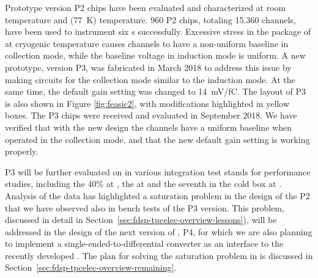 Prototype version P2  chips have been evaluated and 
characterized at room temperature and \lntwo (\SI{77}{K}) temperature. 
\num{960} P2 chips, totaling \num{15,360} channels, 
have been used to instrument six  s successfully. 
Excessive stress in the package of  at cryogenic 
temperature causes  channels to have a non-uniform baseline in 
collection mode, while the baseline  voltage in induction mode 
is uniform. A new prototype, version P3, was fabricated in March 2018 
to address this issue by making  circuits for the collection mode 
similar to the induction mode. At the same time, the default gain
setting was changed to \SI{14}{mV/fC}. The layout of P3
 is also shown in Figure \ref{fig:feasic2}, with modifications 
highlighted in yellow boxes. The P3  chips were 
received and evaluated in September 2018. We have verified that with
the new design the  channels have a uniform baseline when
operated in the collection mode, and that the new default gain setting
is working properly.

P3  will be further evaluated on  
in various integration test stands for performance studies, including 
the \num{40}\%  at , the   
at  and the seventh   
in the cold box at . Analysis of the  data
has highlighted a saturation problem in the design of the P2 
that we have observed also in bench tests of the P3 version. This problem,
discussed in detail in Section~\ref{sec:fdsp-tpcelec-overview-lessons}),
will be addressed in the design of the next version of , P4,
for which we are also planning to implement a single-ended-to-differential
converter as an interface to the recently developed .
The plan for solving the saturation problem in  is discussed 
in Section~\ref{sec:fdsp-tpcelec-overview-remaining}.

\subsubsection{ }
\label{sec:fdsp-tpcelec-design-femb-adc}

